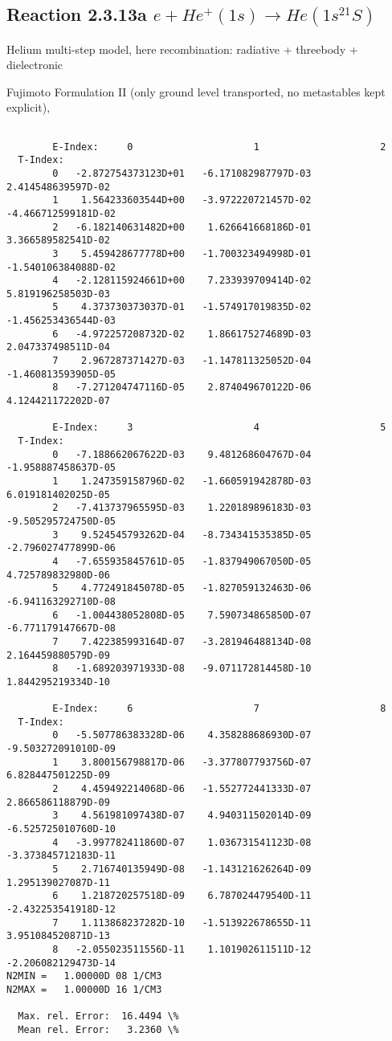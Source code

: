 \documentclass[12pt,dvipdfmx]{article}
\begin{document}
\subsection{
Reaction 2.3.13a  $e + He^+(1s) \rightarrow He(1s^21S) $
}

Helium multi-step model, here recombination: radiative + threebody + dielectronic

 Fujimoto Formulation II (only ground level transported, no metastables kept
explicit), \cite{kn:Fujimoto}


\begin{small}\begin{verbatim}

        E-Index:     0                     1                     2
  T-Index:
        0   -2.872754373123D+01   -6.171082987797D-03    2.414548639597D-02
        1    1.564233603544D+00   -3.972220721457D-02   -4.466712599181D-02
        2   -6.182140631482D+00    1.626641668186D-01    3.366589582541D-02
        3    5.459428677778D+00   -1.700323494998D-01   -1.540106384088D-02
        4   -2.128115924661D+00    7.233939709414D-02    5.819196258503D-03
        5    4.373730373037D-01   -1.574917019835D-02   -1.456253436544D-03
        6   -4.972257208732D-02    1.866175274689D-03    2.047337498511D-04
        7    2.967287371427D-03   -1.147811325052D-04   -1.460813593905D-05
        8   -7.271204747116D-05    2.874049670122D-06    4.124421172202D-07

        E-Index:     3                     4                     5
  T-Index:
        0   -7.188662067622D-03    9.481268604767D-04   -1.958887458637D-05
        1    1.247359158796D-02   -1.660591942878D-03    6.019181402025D-05
        2   -7.413737965595D-03    1.220189896183D-03   -9.505295724750D-05
        3    9.524545793262D-04   -8.734341535385D-05   -2.796027477899D-06
        4   -7.655935845761D-05   -1.837949067050D-05    4.725789832980D-06
        5    4.772491845078D-05   -1.827059132463D-06   -6.941163292710D-08
        6   -1.004438052808D-05    7.590734865850D-07   -6.771179147667D-08
        7    7.422385993164D-07   -3.281946488134D-08    2.164459880579D-09
        8   -1.689203971933D-08   -9.071172814458D-10    1.844295219334D-10

        E-Index:     6                     7                     8
  T-Index:
        0   -5.507786383328D-06    4.358288686930D-07   -9.503272091010D-09
        1    3.800156798817D-06   -3.377807793756D-07    6.828447501225D-09
        2    4.459492214068D-06   -1.552772441333D-07    2.866586118879D-09
        3    4.561981097438D-07    4.940311502014D-09   -6.525725010760D-10
        4   -3.997782411860D-07    1.036731541123D-08   -3.373845712183D-11
        5    2.716740135949D-08   -1.143121626264D-09    1.295139027087D-11
        6    1.218720257518D-09    6.787024479540D-11   -2.432253541918D-12
        7    1.113868237282D-10   -1.513922678655D-11    3.951084520871D-13
        8   -2.055023511556D-11    1.101902611511D-12   -2.206082129473D-14
N2MIN =   1.00000D 08 1/CM3
N2MAX =   1.00000D 16 1/CM3

  Max. rel. Error:  16.4494 \%
  Mean rel. Error:   3.2360 \%
\end{verbatim}\end{small}
\end{document}
